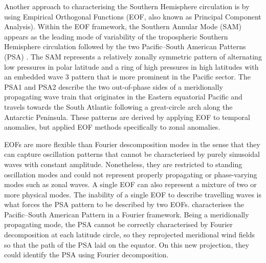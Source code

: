 \documentclass[smallextended]{svjour3}       %
\begin{document}
Another approach to characterising the Southern Hemisphere circulation is by using Empirical Orthogonal Functions (EOF, also known as Principal Component Analysis).
Within the EOF framework, the Southern Annular Mode (SAM) appears as the leading mode of variability of the tropospheric Southern Hemisphere circulation \citep{fogt2020} followed by the two Pacific--South American Patterns (PSA) \citep{mo2001}.
The SAM represents a relatively zonally symmetric pattern of alternating low pressures in polar latitude and a ring of high pressures in high latitudes with an embedded wave 3 pattern that is more prominent in the Pacific sector.
The PSA1 and PSA2 describe the two out-of-phase sides of a meridionally propagating wave train that originates in the Eastern equatorial Pacific and travels towards the South Atlantic following a great-circle arch along the Antarctic Peninsula.
These patterns are derived by applying EOF to temporal anomalies, but \citet{raphael2003} applied EOF methods specifically to zonal anomalies.

EOFs are more flexible than Fourier descomposition modes in the sense that they can capture oscillation patterns that cannot be characterised by purely sinusoidal waves with constant amplitude.
Nonetheless, they are restricted to standing oscillation modes and could not represent properly propagating or phase-varying modes such as zonal waves.
A single EOF can also represent a mixture of two or more physical modes.
The inability of a single EOF to describe travelling waves is what forces the PSA pattern to be described by two EOFs.
\citet{irving2016} characterises the Pacific--South American Pattern in a Fourier framework.
Being a meridionally propagating mode, the PSA cannot be correctly characterised by Fourier decomposition at each latitude circle, so they reprojected meridional wind fields so that the path of the PSA laid on the equator.
On this new projection, they could identify the PSA using Fourier decomposition.
\end{document}

